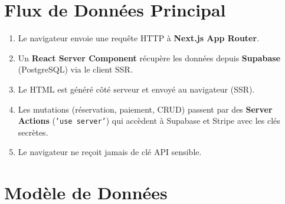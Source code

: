 \documentclass[12pt,a4paper,openany]{report}
\begin{document}
\section{Flux de Données Principal}

\begin{enumerate}
  \item Le navigateur envoie une requête HTTP à \textbf{Next.js App Router}.
  \item Un \textbf{React Server Component} récupère les données depuis \textbf{Supabase} (PostgreSQL) via le client SSR.
  \item Le HTML est généré côté serveur et envoyé au navigateur (SSR).
  \item Les mutations (réservation, paiement, CRUD) passent par des \textbf{Server Actions} (\texttt{'use server'}) qui accèdent à Supabase et Stripe avec les clés secrètes.
  \item Le navigateur ne reçoit jamais de clé API sensible.
\end{enumerate}

\section{Modèle de Données}
\end{document}
